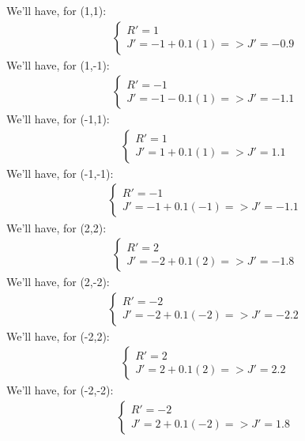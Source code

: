 \documentclass[12pt]{article}
\begin{document}
\begin{enumerate}[label=\alph*.]
    We'll have, for (1,1):
    \begin{align*}
        \begin{cases}
        R' = 1 \\
        J' = -1 + 0.1(1) => J' = -0.9
        \end{cases}
    \end{align*}
    We'll have, for (1,-1):
    \begin{align*}
        \begin{cases}
        R' = -1 \\
        J' = -1 - 0.1(1) => J' = -1.1
        \end{cases}
    \end{align*}
    We'll have, for (-1,1):
    \begin{align*}
        \begin{cases}
        R' = 1 \\
        J' = 1 + 0.1(1) => J' = 1.1
        \end{cases}
    \end{align*}
    We'll have, for (-1,-1):
    \begin{align*}
        \begin{cases}
        R' = -1 \\
        J' = -1 + 0.1(-1) => J' = -1.1
        \end{cases}
    \end{align*}
    We'll have, for (2,2):
    \begin{align*}
        \begin{cases}
        R' = 2 \\
        J' = -2 + 0.1(2) => J' = -1.8
        \end{cases}
    \end{align*}
    We'll have, for (2,-2):
    \begin{align*}
        \begin{cases}
        R' = -2 \\
        J' = -2 + 0.1(-2) => J' = -2.2 
        \end{cases}
    \end{align*}
    We'll have, for (-2,2):
    \begin{align*}
        \begin{cases}
        R' = 2 \\
        J' = 2 + 0.1(2) => J' = 2.2
        \end{cases}
    \end{align*}
    We'll have, for (-2,-2):
    \begin{align*}
        \begin{cases}
        R' = -2 \\
        J' = 2 + 0.1(-2) => J' = 1.8
        \end{cases}
    \end{align*}


\end{enumerate}
\end{document}
